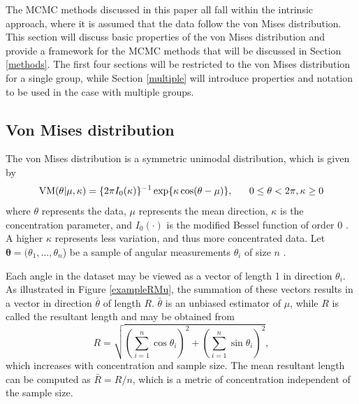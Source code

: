 \documentclass[bib]{ba/ba}
\begin{document}
The MCMC methods discussed in this paper all fall within the intrinsic approach, where it is assumed that the data follow the von Mises distribution. This section will discuss basic properties of the von Mises distribution and provide a framework for the MCMC methods that will be discussed in Section \ref{methods}. The first four sections will be restricted to the von Mises distribution for a single group, while Section \ref{multiple} will introduce properties and notation to be used in the case with multiple groups. 

\subsection{Von Mises distribution}

The von Mises distribution is a symmetric unimodal distribution, which is given by
$$ \textnormal{VM}(\theta \vert \mu, \kappa) = \{2 \pi I_0(\kappa)\}^{-1} \exp\{\kappa \cos(\theta - \mu)\} , ~~~~~ 0\leq \theta < 2\pi, \kappa \geq 0$$
where $\theta$ represents the data, $\mu$ represents the mean direction, $\kappa$ is the concentration parameter, and $I_0(\cdot)$ is the modified Bessel function of order 0 \citep{abramowitz1972handbook}. A higher $\kappa$ represents less variation, and thus more concentrated data. Let $\boldsymbol\theta=(\theta_1, \dots, \theta_n$) be a sample of angular measurements $\theta_i$ of size $n$%
.

Each angle in the dataset may be viewed as a vector of length 1 in direction $\theta_i$. As illustrated in Figure \ref{exampleRMu}, the summation of these vectors results in a vector in direction $\bar{\theta}$ of length $R$. $\bar{\theta}$ is an unbiased estimator of $\mu$, while $R$ is called the resultant length and may be obtained from
$$ R = \sqrt{\left(\sum_{i=1}^{n} \cos \theta_i \right)^2 + \left(\sum_{i=1}^{n} \sin \theta_i \right)^2},$$
which increases with concentration and sample size. The mean resultant length can be computed as $\bar{R} = R/n$, which is a metric of concentration independent of the sample size. %
\end{document}
